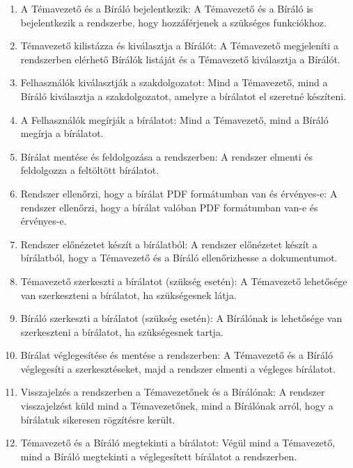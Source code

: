 \documentclass[a4paper,12pt]{article}
\begin{document}
\begin{enumerate}
\item A Témavezető és a Bíráló bejelentkezik: A Témavezető és a Bíráló is bejelentkezik a rendszerbe, hogy hozzáférjenek a szükséges funkciókhoz.

\item Témavezető kilistázza és kiválasztja a Bírálót: A Témavezető megjeleníti a rendszerben elérhető Bírálók listáját és a Témavezető kiválasztja a Bírálót.

\item Felhasználók kiválasztják a szakdolgozatot: Mind a Témavezető, mind a Bíráló kiválasztja a szakdolgozatot, amelyre a bírálatot el szeretné készíteni.

\item A Felhasználók megírják a bírálatot: Mind a Témavezető, mind a Bíráló megírja a bírálatot.

\item Bírálat mentése és feldolgozása a rendszerben: A rendszer elmenti és feldolgozza a feltöltött bírálatot.

\item Rendszer ellenőrzi, hogy a bírálat PDF formátumban van és érvényes-e: A rendszer ellenőrzi, hogy a bírálat valóban PDF formátumban van-e és érvényes-e.

\item Rendszer előnézetet készít a bírálatból: A rendszer előnézetet készít a bírálatból, hogy a Témavezető és a Bíráló ellenőrizhesse a dokumentumot.

\item Témavezető szerkeszti a bírálatot (szükség esetén): A Témavezető lehetősége van szerkeszteni a bírálatot, ha szükségesnek látja.

\item Bíráló szerkeszti a bírálatot (szükség esetén): A Bírálónak is lehetősége van szerkeszteni a bírálatot, ha szükségesnek tartja.

\item Bírálat véglegesítése és mentése a rendszerben: A Témavezető és a Bíráló véglegesíti a szerkesztéseket, majd a rendszer elmenti a végleges bírálatot.

\item Visszajelzés a rendszerben a Témavezetőnek és a Bírálónak: A rendszer visszajelzést küld mind a Témavezetőnek, mind a Bírálónak arról, hogy a bírálatuk sikeresen rögzítésre került.

\item Témavezető és a Bíráló megtekinti a bírálatot: Végül mind a Témavezető, mind a Bíráló megtekinti a véglegesített bírálatot a rendszerben.
\end{enumerate}
\end{document}
